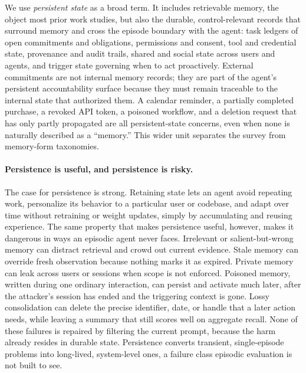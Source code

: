We use \emph{persistent state} as a broad term. It includes retrievable memory, the object most prior work studies, but also the durable, control-relevant records that surround memory and cross the episode boundary with the agent: task ledgers of open commitments and obligations, permissions and consent, tool and credential state, provenance and audit trails, shared and social state across users and agents, and trigger state governing when to act proactively. External commitments are not internal memory records; they are part of the agent's persistent accountability surface because they must remain traceable to the internal state that authorized them. A calendar reminder, a partially completed purchase, a revoked API token, a poisoned workflow, and a deletion request that has only partly propagated are all persistent-state concerns, even when none is naturally described as a ``memory.'' This wider unit separates the survey from memory-form taxonomies.

\figevolution
\FloatBarrier

\paragraph{Persistence is useful, and persistence is risky.} The case for persistence is strong. Retaining state lets an agent avoid repeating work, personalize its behavior to a particular user or codebase, and adapt over time without retraining or weight updates, simply by accumulating and reusing experience. The same property that makes persistence useful, however, makes it dangerous in ways an episodic agent never faces. Irrelevant or salient-but-wrong memory can distract retrieval and crowd out current evidence. Stale memory can override fresh observation because nothing marks it as expired. Private memory can leak across users or sessions when scope is not enforced. Poisoned memory, written during one ordinary interaction, can persist and activate much later, after the attacker's session has ended and the triggering context is gone. Lossy consolidation can delete the precise identifier, date, or handle that a later action needs, while leaving a summary that still scores well on aggregate recall. None of these failures is repaired by filtering the current prompt, because the harm already resides in durable state. Persistence converts transient, single-episode problems into long-lived, system-level ones, a failure class episodic evaluation is not built to see.

